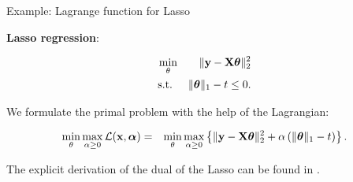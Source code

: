 \documentclass[11pt,compress,t,notes=noshow, xcolor=table]{beamer}
\begin{document}
\begin{vbframe}{Example: Lagrange function for Lasso}

\textbf{Lasso regression}: 

\begin{eqnarray*}
	\min_\theta && \|\mathbf{y} - \mathbf{X} \bm{\theta}\|_2^2 \\
	\text{s.t. } && \|\bm{\theta}\|_1 - t \le 0.
\end{eqnarray*}

We formulate the primal problem with the help of the Lagrangian:

\begin{eqnarray*}
	\min_\theta \max_{\alpha \ge 0} \mathcal{L}(\mathbf{x}, \bm{\alpha}) &=& \min_\theta \max_{\alpha \ge 0} \left\{\|\mathbf{y} - \mathbf{X} \bm{\theta}\|_2^2 + \alpha \left(\|\bm{\theta}\|_1 - t\right)\right\}.
\end{eqnarray*}

The explicit derivation of the dual of the Lasso can be found in 
\href{https://sites.stat.washington.edu/courses/stat527/s13/readings/osborneetal00.pdf}{}.

\end{vbframe}
\end{document}
